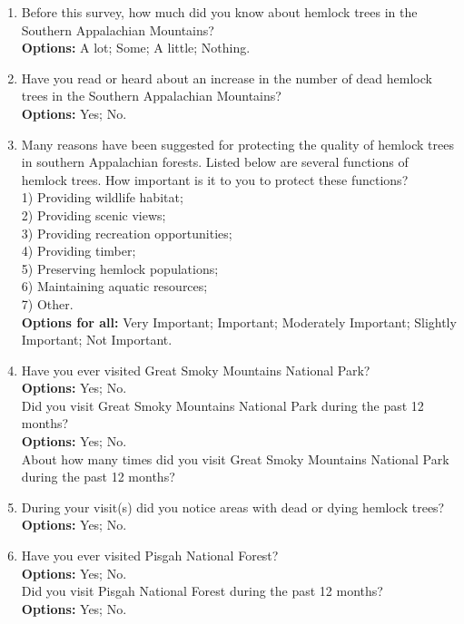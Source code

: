 \documentclass[12pt]{article}
\begin{document}
\begin{enumerate}[label=Q\arabic*., leftmargin=*]
    \item Before this survey, how much did you know about hemlock trees in the Southern Appalachian Mountains?\\
    \textbf{Options:} A lot; Some; A little; Nothing.
    \item Have you read or heard about an increase in the number of dead hemlock trees in the Southern Appalachian Mountains? \\
    \textbf{Options:} Yes; No.
    \item Many reasons have been suggested for protecting the quality of hemlock trees in southern Appalachian forests. Listed below are several functions of hemlock trees. How important is it to you to protect these functions? \\
    1) Providing wildlife habitat; \\
    2) Providing scenic views; \\
    3) Providing recreation opportunities; \\
    4) Providing timber; \\
    5) Preserving hemlock populations; \\
    6) Maintaining aquatic resources; \\
    7) Other. \\
    \textbf{Options for all:} Very Important; Important; Moderately Important; Slightly Important; Not Important.
    \item Have you ever visited Great Smoky Mountains National Park? \\
    \textbf{Options:} Yes; No. \\
    Did you visit Great Smoky Mountains National Park during the past 12 months? \\
    \textbf{Options:} Yes; No. \\
    About how many times did you visit Great Smoky Mountains National Park during the past 12 months?
    \item During your visit(s) did you notice areas with dead or dying hemlock trees? \\
    \textbf{Options:} Yes; No.
    \item Have you ever visited Pisgah National Forest? \\
    \textbf{Options:} Yes; No. \\
    Did you visit Pisgah National Forest during the past 12 months? \\
    \textbf{Options:} Yes; No. \\

\end{enumerate}
\end{document}
